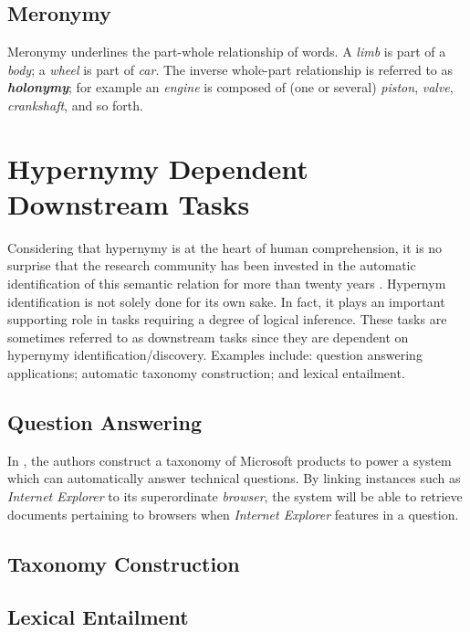 \subsection{Meronymy}
Meronymy underlines the part-whole relationship of words.  A \textit{limb} is part of a \textit{body}; a \textit{wheel} is part of \textit{car}.  The inverse whole-part relationship is referred to as \textbf{\textit{holonymy}}; for example an \textit{engine} is composed of (one or several) \textit{piston}, \textit{valve}, \textit{crankshaft}, and so forth.

\section{Hypernymy Dependent Downstream Tasks}
Considering that hypernymy is at the heart of human comprehension, it is no surprise that the research community has been invested in the automatic identification of this semantic relation for more than twenty years \citep{camacho2018semeval}.  Hypernym identification is not solely done for its own sake.  In fact, it plays an important supporting role in tasks requiring a degree of logical inference.  These tasks are sometimes referred to as downstream tasks since they are dependent on hypernymy identification/discovery.  Examples include: question answering applications; automatic taxonomy construction; and lexical entailment.

\subsection{Question Answering}
In \citep{yang2017efficiently}, the authors construct a taxonomy of Microsoft products to power a system which can automatically answer technical questions. By linking instances such as \textit{Internet Explorer} to its superordinate \textit{browser}, the system will be able to retrieve documents pertaining to browsers when \textit{Internet Explorer} features in a question.

\subsection{Taxonomy Construction}

\subsection{Lexical Entailment}

